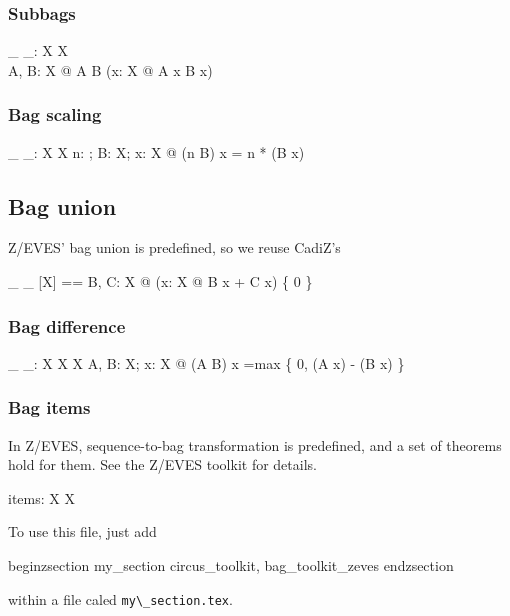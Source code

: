 \documentclass[draft,a4paper,10pt,wd]{article}
\begin{document}
\subsubsection*{Subbags}

\begin{gendef}[X]
  \_ \subbageq \_: \bag X \rel \bag X \\
\where
  \forall A, B: \bag X @ A \subbageq B \iff
	(\forall x: X @ A \bcount x \leq B \bcount x)
\end{gendef}

\subsubsection*{Bag scaling}

\begin{gendef}[X]
  \_ \otimes \_: \nat \cross \bag X \fun \bag X
\where
  \forall n: \nat; B: \bag X; x: X @
     (n \otimes B) \bcount x = n * (B \bcount x)
\end{gendef}

\subsection*{Bag union }

Z/EVES' bag union is predefined, so we reuse CadiZ's
\begin{zed}
\_ \uplus \_ [X] == \lambda B, C: \bag X @ (\lambda x: X @ B \bcount x + C \bcount x) \nrres \{ 0 \}
\end{zed}

\subsubsection*{Bag difference}

\begin{gendef}[X]
  \_ \uminus \_: \bag X \cross \bag X \fun \bag X
\where
  \forall A, B: \bag X; x: X @
     (A \uminus B) \bcount x =max \{ 0, (A \bcount x) - (B \bcount x) \}
\end{gendef}

\subsubsection*{Bag items}

In Z/EVES, sequence-to-bag transformation is predefined, and a set
of theorems hold for them. See the Z/EVES toolkit for details.
%
\begin{gendef}[X]
  items: \seq X \fun \bag X
\end{gendef}

To use this file, just add  

begin{zsection}
\SECTION my\_section \parents circus\_toolkit, bag\_toolkit\_zeves
end{zsection}

within a file caled \verb'my\_section.tex'.
\end{document}
